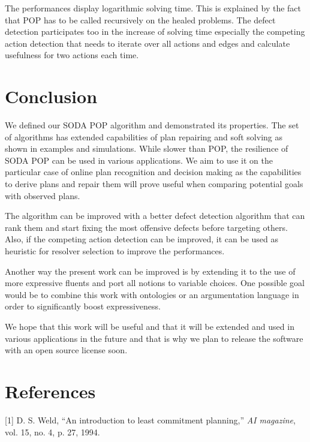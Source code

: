 \documentclass[]{article}
\begin{document}
The performances display logarithmic solving time. This is explained by
the fact that POP has to be called recursively on the healed problems.
The defect detection participates too in the increase of solving time
especially the competing action detection that needs to iterate over all
actions and edges and calculate usefulness for two actions each time.

\section*{Conclusion}\label{conclusion}

We defined our SODA POP algorithm and demonstrated its properties. The
set of algorithms has extended capabilities of plan repairing and soft
solving as shown in examples and simulations. While slower than POP, the
resilience of SODA POP can be used in various applications. We aim to
use it on the particular case of online plan recognition and decision
making as the capabilities to derive plans and repair them will prove
useful when comparing potential goals with observed plans.

The algorithm can be improved with a better defect detection algorithm
that can rank them and start fixing the most offensive defects before
targeting others. Also, if the competing action detection can be
improved, it can be used as heuristic for resolver selection to improve
the performances.

Another way the present work can be improved is by extending it to the
use of more expressive fluents and port all notions to variable choices.
One possible goal would be to combine this work with ontologies or an
argumentation language in order to significantly boost expressiveness.

We hope that this work will be useful and that it will be extended and
used in various applications in the future and that is why we plan to
release the software with an open source license soon.

\section*{References}\label{references}

\hypertarget{refs}{}
\hypertarget{ref-weldux5fintroductionux5f1994}{}
{[}1{]} D. S. Weld, ``An introduction to least commitment planning,''
\emph{AI magazine}, vol. 15, no. 4, p. 27, 1994.
\end{document}
